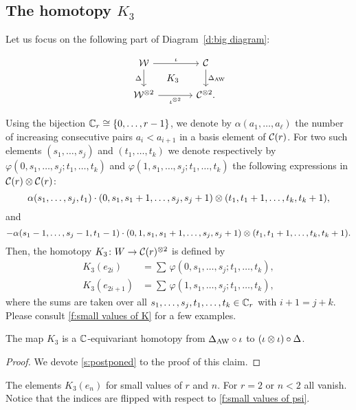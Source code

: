 \subsection{The homotopy $K_3$}\label{ss:coproduct}

Let us focus on the following part of Diagram~\eqref{d:big diagram}:

\begin{equation}\label{d:coproducts}
	\begin{tikzcd}[column sep=large]
			\cW \arrow[r,"\iota"] \arrow[d,"\Delta"'] \arrow[dr,phantom,"K_3"]&
			\cC \arrow[d,"\Delta_{\AW}"] \\
			\cW^{\ot 2} \arrow[r,"\iota^{\ot 2}"'] &
			\cC^{\ot 2}.
		\end{tikzcd}
\end{equation}

Using the bijection $\mathbb{C}_r \cong \{0,\dots,r-1\}$, we denote by $\alpha(a_1,\dots,a_\ell)$ the number of increasing consecutive pairs $a_i < a_{i+1}$ in a basis element of $\mathcal{C}(r)$.
For two such elements $(s_1,\dots,s_j)$ and $(t_1,\dots,t_k)$ we denote respectively by $\varphi(0,s_1,\dots,s_j;t_1,\dots,t_k)$ and $\varphi(1,s_1,\dots,s_j;t_1,\dots,t_k)$ the following expressions in $\mathcal{C}(r) \otimes \mathcal{C}(r)$:
\[
\alpha(s_1,\dots,s_j,t_1) \cdot
(0,s_1,s_1+1,\dots,s_j,s_j+1) \otimes
(t_1,t_1+1,\dots,t_k,t_k+1),
\]
and
\[
- \alpha(s_1-1,\dots,s_j-1,t_1-1) \cdot
(0,1,s_1,s_1+1,\dots,s_j,s_j+1)\otimes (t_1,t_1+1,\dots,t_k,t_k+1).
\]
Then, the homotopy $K_3 \colon W \to \mathcal{C}(r)^{\otimes 2}$ is defined by
\[
\begin{split}
	K_3(e_{2i})  &= \sum \, \varphi(0,s_1,\dots,s_j;t_1,\dots,t_k), \\
	K_3(e_{2i+1}) &= \sum \, \varphi(1,s_1,\dots,s_j;t_1,\dots,t_k),
\end{split}
\]
where the sums are taken over all $s_1,\dots,s_j,t_1,\dots,t_k \in \mathbb{C}_r$ with $i+1 = j+k$.
Please consult \cref{f:small values of K} for a few examples.

\begin{lemma}\label{l:K3}
	The map $K_3$ is a $\mathbb{C}$-equivariant homotopy from $\Delta_{\operatorname{AW}} \mathbin{\circ} \iota$ to $(\iota \otimes \iota) \mathbin{\circ} \Delta$.
\end{lemma}

\begin{proof}
	We devote \cref{s:postponed} to the proof of this claim.
\end{proof}

\begin{table}
	\centering
	
	\caption{The elements $K_3(e_n)$ for small values of $r$ and $n$. For $r=2$ or $n<2$ all vanish. Notice that the indices are flipped with respect to \cref{f:small values of psi}.}
	\label{f:small values of K}
\end{table}

